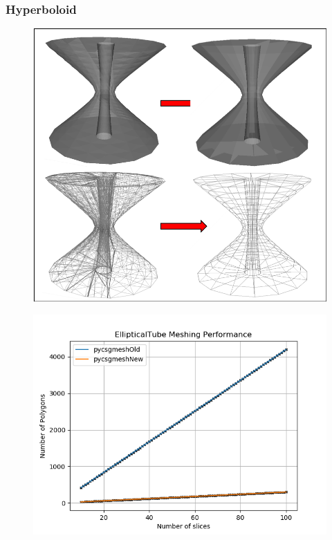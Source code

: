 \documentclass[12pt,a4paper]{article}
\begin{document}
\subsubsection{Hyperboloid}

\begin{figure}[h!]
\centering
\begin{minipage}{.2\textwidth}
  \centering
  \includegraphics[height=0.9\linewidth]{Images//Meshes//hyperboloid.png}
  \label{fig:test1}
\end{minipage}%
\begin{minipage}{.3\textwidth}
  \centering
  \includegraphics[scale=0.35]{Images//Quad_fits//EllipticalTube_quad.png}
  \label{fig:test2}
\end{minipage}%
\end{figure}
\end{document}
